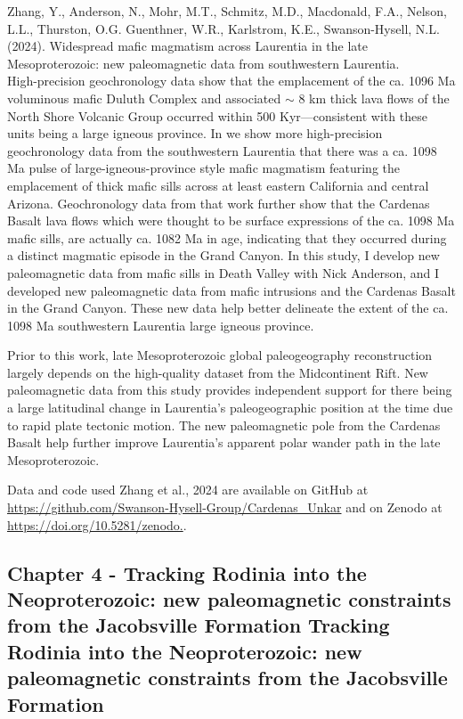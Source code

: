 \documentclass{ucbthesis}
\begin{document}
\begin{frontmatter}
Zhang, Y., Anderson, N., Mohr, M.T., Schmitz, M.D., Macdonald, F.A., Nelson, L.L., Thurston, O.G. Guenthner, W.R., Karlstrom, K.E., Swanson-Hysell, N.L. (2024). Widespread mafic magmatism across Laurentia in the late Mesoproterozoic: new paleomagnetic data from southwestern Laurentia. 
\\

High-precision geochronology data show that the emplacement of the ca. 1096 Ma voluminous mafic Duluth Complex and associated $\sim$ 8 km thick lava flows of the North Shore Volcanic Group occurred within 500 Kyr---consistent with these units being a large igneous province. In \cite{Mohr2024a} we show more high-precision geochronology data from the southwestern Laurentia that there was a ca. 1098 Ma pulse of large-igneous-province style mafic magmatism featuring the emplacement of thick mafic sills across at least eastern California and central Arizona. Geochronology data from that work further show that the Cardenas Basalt lava flows which were thought to be surface expressions of the ca. 1098 Ma mafic sills, are actually ca. 1082 Ma in age, indicating that they occurred during a distinct magmatic episode in the Grand Canyon. In this study, I develop new paleomagnetic data from mafic sills in Death Valley with Nick Anderson, and I developed new paleomagnetic data from mafic intrusions and the Cardenas Basalt in the Grand Canyon. These new data help better delineate the extent of the ca. 1098 Ma southwestern Laurentia large igneous province.

Prior to this work, late Mesoproterozoic global paleogeography reconstruction largely depends on the high-quality dataset from the Midcontinent Rift. New paleomagnetic data from this study provides independent support for there being a large latitudinal change in Laurentia's paleogeographic position at the time due to rapid plate tectonic motion. The new paleomagnetic pole from the Cardenas Basalt help further improve Laurentia's apparent polar wander path in the late Mesoproterozoic.

Data and code used Zhang et al., 2024 are available on GitHub at \url{https://github.com/Swanson-Hysell-Group/Cardenas_Unkar} and on Zenodo at \url{https://doi.org/10.5281/zenodo.}.

\subsection{Chapter 4 - Tracking Rodinia into the Neoproterozoic: new paleomagnetic constraints from the Jacobsville Formation	Tracking Rodinia into the Neoproterozoic: new paleomagnetic constraints from the Jacobsville Formation}


\end{frontmatter}
\end{document}
